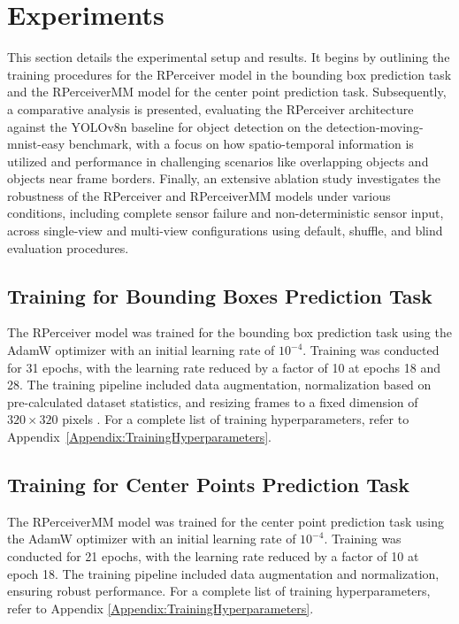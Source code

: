 \section{Experiments}  \label{Experiments}

This section details the experimental setup and results. It begins by outlining the training procedures for the RPerceiver model in the bounding box prediction task and the RPerceiverMM model for the center point prediction task. Subsequently, a comparative analysis is presented, evaluating the RPerceiver architecture against the YOLOv8n baseline for object detection on the detection-moving-mnist-easy benchmark, with a focus on how spatio-temporal information is utilized and performance in challenging scenarios like overlapping objects and objects near frame borders. Finally, an extensive ablation study investigates the robustness of the RPerceiver and RPerceiverMM models under various conditions, including complete sensor failure and non-deterministic sensor input, across single-view and multi-view configurations using default, shuffle, and blind evaluation procedures.

\subsection{Training for Bounding Boxes Prediction Task} \label{Experiments:TrainingBoundingBoxesTask}

The RPerceiver model was trained for the bounding box prediction task using the AdamW optimizer \cite{loshchilovDecoupledWeightDecay2019a} with an initial learning rate of $10^{-4}$. Training was conducted for 31 epochs, with the learning rate reduced by a factor of 10 at epochs 18 and 28. The training pipeline included data augmentation, normalization based on pre-calculated dataset statistics, and resizing frames to a fixed dimension of $320 \times 320$ pixels \cite{redmonYOLO9000BetterFaster2016}. For a complete list of training hyperparameters, refer to Appendix~\ref{Appendix:TrainingHyperparameters}.

\subsection{Training for Center Points Prediction Task} \label{Experiments:TrainingCenterPointsTask}

The RPerceiverMM model was trained for the center point prediction task using the AdamW optimizer \cite{loshchilovDecoupledWeightDecay2019a} with an initial learning rate of $10^{-4}$. Training was conducted for 21 epochs, with the learning rate reduced by a factor of 10 at epoch 18. The training pipeline included data augmentation and normalization, ensuring robust performance. For a complete list of training hyperparameters, refer to Appendix \ref{Appendix:TrainingHyperparameters}.

